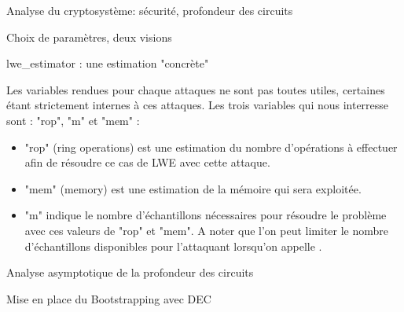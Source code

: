 \begin{section}{Analyse du cryptosystème: sécurité, profondeur des circuits}
\begin{subsection}{Choix de paramètres, deux visions}
\begin{subsubsection}{lwe\_estimator : une estimation "concrète"}
	\flushleft
	
	Les variables rendues pour chaque attaques ne sont pas toutes utiles, certaines étant strictement
	internes à ces attaques. Les trois variables qui nous interresse sont : "rop", "m" et "mem" :
	
	\begin{itemize}
	\item "rop" (ring operations) est une estimation du nombre d'opérations à effectuer afin de résoudre
	ce cas de LWE avec cette attaque.
	
	\item "mem" (memory) est une estimation de la mémoire qui sera exploitée.
	
	\item "m" indique le nombre d'échantillons nécessaires pour résoudre le problème avec ces valeurs de
	"rop" et "mem". A noter que l'on peut limiter le nombre d'échantillons disponibles pour l'attaquant
	lorsqu'on appelle .
	\end{itemize}

	\end{subsubsection}
	\end{subsection}
	\begin{subsection}{Analyse asymptotique de la profondeur des circuits}
	\end{subsection}
	\begin{subsection}{Mise en place du Bootstrapping avec DEC}
	\end{subsection}
\end{section}
